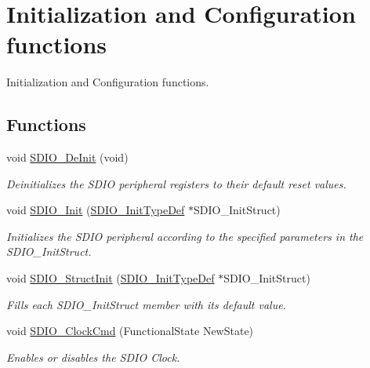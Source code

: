 \hypertarget{group___s_d_i_o___group1}{}\section{Initialization and Configuration functions}
\label{group___s_d_i_o___group1}


Initialization and Configuration functions.  


\subsection*{Functions}
\begin{DoxyCompactItemize}
\item 
void \hyperlink{group___s_d_i_o___group1_gac359d2c6c67a2590f8f9b720c0e4ff1b}{S\+D\+I\+O\+\_\+\+De\+Init} (void)
\begin{DoxyCompactList}\small\item\em Deinitializes the S\+D\+I\+O peripheral registers to their default reset values. \end{DoxyCompactList}\item 
void \hyperlink{group___s_d_i_o___group1_gad40764a8e37c0ed5c9141ae338ff0203}{S\+D\+I\+O\+\_\+\+Init} (\hyperlink{struct_s_d_i_o___init_type_def}{S\+D\+I\+O\+\_\+\+Init\+Type\+Def} $\ast$S\+D\+I\+O\+\_\+\+Init\+Struct)
\begin{DoxyCompactList}\small\item\em Initializes the S\+D\+I\+O peripheral according to the specified parameters in the S\+D\+I\+O\+\_\+\+Init\+Struct. \end{DoxyCompactList}\item 
void \hyperlink{group___s_d_i_o___group1_ga778d338c29df4fae9ef69432e6df32ad}{S\+D\+I\+O\+\_\+\+Struct\+Init} (\hyperlink{struct_s_d_i_o___init_type_def}{S\+D\+I\+O\+\_\+\+Init\+Type\+Def} $\ast$S\+D\+I\+O\+\_\+\+Init\+Struct)
\begin{DoxyCompactList}\small\item\em Fills each S\+D\+I\+O\+\_\+\+Init\+Struct member with its default value. \end{DoxyCompactList}\item 
void \hyperlink{group___s_d_i_o___group1_ga7243b857d6b323748ff3a493b265bedc}{S\+D\+I\+O\+\_\+\+Clock\+Cmd} (Functional\+State New\+State)
\begin{DoxyCompactList}\small\item\em Enables or disables the S\+D\+I\+O Clock. \end{DoxyCompactList}\item 

\end{DoxyCompactItemize}
